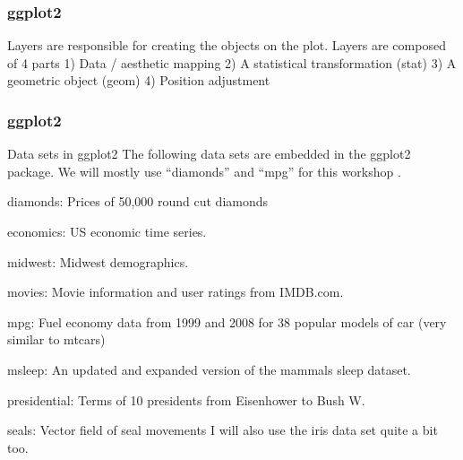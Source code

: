 \begin{frame}[fragile]
\frametitle{ggplot2}
\largeLayers
Layers are responsible for creating the objects on the plot. Layers are composed of 4 parts
1) Data / aesthetic mapping
2) A statistical transformation (stat)
3) A geometric object (geom)
4) Position adjustment
\end{frame}
\begin{frame}[fragile]
\frametitle{ggplot2}
\large
Data sets in ggplot2
The following data sets are embedded in the ggplot2 package. We will mostly use “diamonds” and “mpg” for this workshop .
\item diamonds: Prices of 50,000 round cut diamonds
\item economics: US economic time series.
\item midwest: Midwest demographics.
\item movies: Movie information and user ratings from IMDB.com.
\item mpg: Fuel economy data from 1999 and 2008 for 38 popular models of car (very similar to mtcars)
\item msleep: An updated and expanded version of the mammals sleep dataset.
\item presidential: Terms of 10 presidents from Eisenhower to Bush W.
\item seals: Vector field of seal movements
I will also use the iris data set quite a bit too.
\end{frame}
